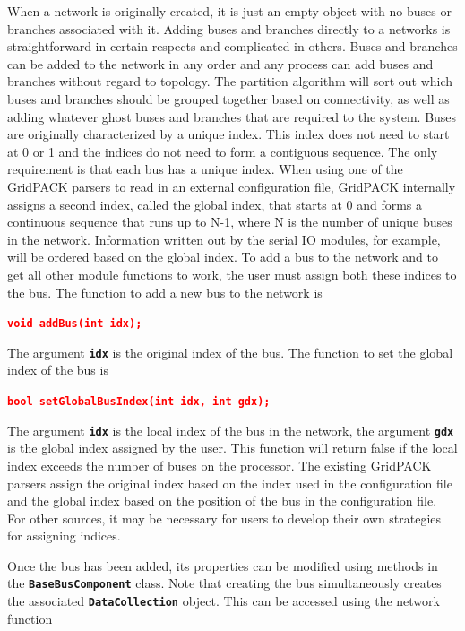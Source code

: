 \documentclass[12pt]{report} %
\begin{document}
When a network is originally created, it is just an empty object with no buses or branches associated with it. Adding buses and branches directly to a networks is straightforward in certain respects and complicated in others. Buses and branches can be added to the network in any order and any process can add buses and branches without regard to topology. The partition algorithm will sort out which buses and branches should be grouped together based on connectivity, as well as adding whatever ghost buses and branches that are required to the system. Buses are originally characterized by a unique index. This index does not need to start at 0 or 1 and the indices do not need to form a contiguous sequence. The only requirement is that each bus has a unique index. When using one of the GridPACK parsers to read in an external configuration file, GridPACK internally assigns a second index, called the global index, that starts at 0 and forms a continuous sequence that runs up to N-1, where N is the number of unique buses in the network. Information written out by the serial IO modules, for example, will be ordered based on the global index. To add a bus to the network and to get all other module functions to work, the user must assign both these indices to the bus. The function to add a new bus to the network is

\textcolor{red}{\texttt{\textbf{void addBus(int idx);}}}

The argument \texttt{\textbf{idx}} is the original index of the bus. The function to set the global index of the bus is

\textcolor{red}{\texttt{\textbf{bool setGlobalBusIndex(int idx, int gdx);}}}

The argument \texttt{\textbf{idx}} is the local index of the bus in the network, the argument \texttt{\textbf{gdx}} is the global index assigned by the user. This function will return false if the local index exceeds the number of buses on the processor. The existing GridPACK parsers assign the original index based on the index used in the configuration file and the global index based on the position of the bus in the configuration file. For other sources, it may be necessary for users to develop their own strategies for assigning indices.

Once the bus has been added, its properties can be modified using methods in the \texttt{\textbf{BaseBusComponent}} class. Note that creating the bus simultaneously creates the associated \texttt{\textbf{DataCollection}} object. This can be accessed using the network function
\end{document}
